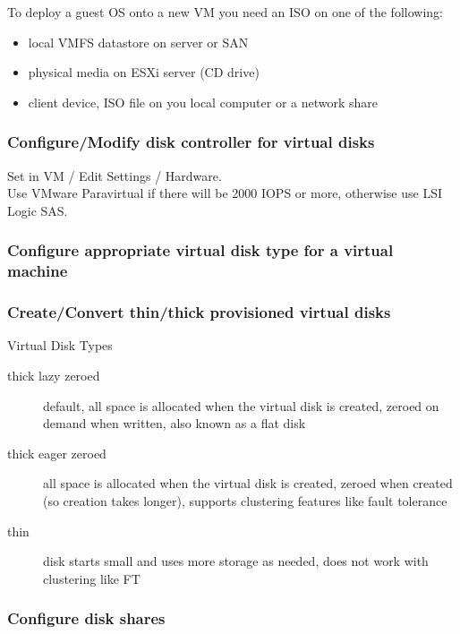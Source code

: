 To deploy a guest OS onto a new VM you need an ISO on one of the following:

\begin{itemize}
\item local VMFS datastore on server or SAN
\item physical media on ESXi server (CD drive)
\item client device, ISO file on you local computer or a network share
\end{itemize}

\subsubsection{Configure/Modify disk controller for virtual disks}

Set in VM / Edit Settings / Hardware.\\

Use VMware Paravirtual if there will be 2000 IOPS or more, otherwise use
LSI Logic SAS.

\subsubsection{Configure appropriate virtual disk type for a virtual machine}

\subsubsection{Create/Convert thin/thick provisioned virtual disks}

Virtual Disk Types

\begin{description}

\item[thick lazy zeroed]
default, all space is allocated when the virtual disk is created, zeroed on
demand when written, also known as a flat disk

\item[thick eager zeroed]
all space is allocated when the virtual disk is created, zeroed when created
(so creation takes longer), supports clustering features like fault tolerance

\item[thin]
disk starts small and uses more storage as needed, does not work with
clustering like FT

\end{description}

\subsubsection{Configure disk shares}

